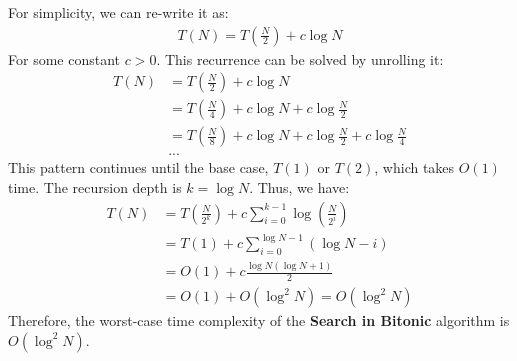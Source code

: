 \documentclass[11pt, a4paper, oneside]{memoir}
\begin{document}
For simplicity, we can re-write it as:
\begin{align*}
    T(N) = T(\frac{N}{2}) + c\log N
\end{align*}
For some constant $c > 0$. This recurrence can be solved by unrolling it:
\begin{align*}
    T(N) & = T(\frac{N}{2}) + c\log N                                         \\
         & = T(\frac{N}{4}) + c\log N + c\log \frac{N}{2}                     \\
         & = T(\frac{N}{8}) + c\log N + c\log \frac{N}{2} + c\log \frac{N}{4} \\
         & ...
\end{align*}
This pattern continues until the base case, $T(1)$ or $T(2)$, which takes $O(1)$ time. The recursion depth is $k = \log N$. Thus, we have:
\begin{align*}
    T(N) & = T(\frac{N}{2^k}) + c \sum_{i=0}^{k-1} \log(\frac{N}{2^i}) \\
         & = T(1) + c \sum_{i=0}^{\log N - 1} (\log N - i)             \\
         & = O(1) + c \frac{\log N (\log N + 1)}{2}                    \\
         & = O(1) +O(\log^2 N) = O(\log^2 N)
\end{align*}
Therefore, the worst-case time complexity of the \textbf{Search in Bitonic} algorithm is $O(\log^2 N)$.
\end{document}
